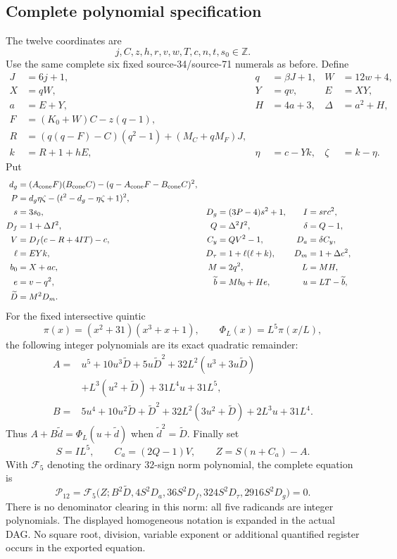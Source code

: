 \documentclass[11pt]{article}
\begin{document}
\subsection{Complete polynomial specification}
The twelve coordinates are
\[
 j,C,z,h,r,v,w,T,c,n,t,s_0\in\mathbb Z.
\]
Use the same complete six fixed source-34/source-71 numerals as before.
Define
\begin{align*}
 J&=6j+1,&q&=\beta J+1,&W&=12w+4,\\
 X&=qW,&Y&=qv,&E&=XY,\\
 a&=E+Y,&H&=4a+3,&\Delta&=a^2+H,\\
 F&=(K_0+W)C-z(q-1),&&&\\
 R&=(q(q-F)-C)(q^2-1)+(M_C+qM_F)J,&&&\\
 k&=R+1+hE,&\eta&=c-Yk,&\zeta&=k-\eta.
\end{align*}
Put
\begin{align*}
 d_g&=(A_{\rm cone}F)(B_{\rm cone}C)
          -(q-A_{\rm cone}F-B_{\rm cone}C)^2,\\
 P&=d_g\eta\zeta-(t^2-d_g-\eta\zeta+1)^2,\\
 s&=3s_0,&D_g&=(3P-4)s^2+1,&I&=src^2,\\
 D_f&=1+\Delta I^2,&Q&=\Delta^2 I^2,&\delta&=Q-1,\\
 V&=D_f(c-R+4IT)-c,&C_y&=QV^2-1,&D_a&=\delta C_y,\\
 \ell&=EYk,&D_\tau&=1+\ell(\ell+k),&D_m&=1+\Delta c^2,\\
 b_0&=X+ac,&M&=2q^2,&L&=MH,\\
 e&=v-q^2,&\widetilde b&=Mb_0+He,&
 u&=LT-\widetilde b,\\
 \widetilde D&=M^2D_m.&&&
\end{align*}
For the fixed intersective quintic
\[
 \pi(x)=(x^2+31)(x^3+x+1),\qquad
 \Phi_L(x)=L^5\pi(x/L),
\]
the following integer polynomials are its exact quadratic remainder:
\begin{align*}
 A={}&u^5+10u^3\widetilde D+5u\widetilde D^2
       +32L^2(u^3+3u\widetilde D)\\
    &+L^3(u^2+\widetilde D)+31L^4u+31L^5,\\
 B={}&5u^4+10u^2\widetilde D+\widetilde D^2
       +32L^2(3u^2+\widetilde D)+2L^3u+31L^4.
\end{align*}
Thus $A+B\widetilde d=\Phi_L(u+\widetilde d)$ when
$\widetilde d^2=\widetilde D$. Finally set
\[
 S=IL^5,\qquad C_a=(2Q-1)V,\qquad Z=S(n+C_a)-A.
\]
With $\mathcal F_5$ denoting the ordinary $32$-sign norm polynomial,
the complete equation is
\[
 \boxed{\mathcal P_{12}
 =\mathcal F_5\bigl(Z;B^2\widetilde D,
 4S^2D_a,36S^2D_f,324S^2D_\tau,2916S^2D_g\bigr)=0.}
\]
There is no denominator clearing in this norm: all five radicands are
integer polynomials. The displayed homogeneous notation is expanded in
the actual DAG. No square root, division, variable exponent or additional
quantified register occurs in the exported equation.
\end{document}

